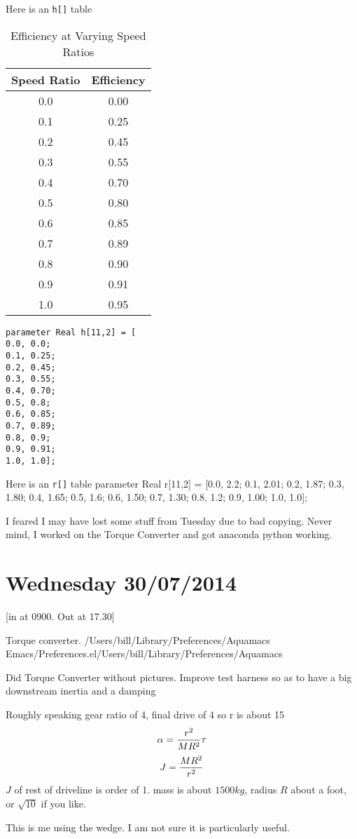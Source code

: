 \documentclass[11pt, oneside]{article}   	%
\begin{document}
Here is an \verb+h[]+ table
\begin{table}[h]
  \centering
  \begin{tabular}{| c | c |}
\hline
Speed Ratio & Efficiency \\
\hline
\hline
0.0 &  0.00 \\ 
0.1 &  0.25 \\ 
0.2 &  0.45 \\ 
0.3 &  0.55 \\ 
0.4 &  0.70 \\ 
0.5 &  0.80 \\ 
0.6 &  0.85 \\ 
0.7 &  0.89 \\ 
0.8 &  0.90 \\ 
0.9 &  0.91 \\ 
1.0 &  0.95 \\
\hline
  \end{tabular}
  \caption{Efficiency at Varying Speed Ratios}
  \label{tab:efficiency}
\end{table}
\begin{verbatim}
parameter Real h[11,2] = [
0.0, 0.0; 
0.1, 0.25; 
0.2, 0.45; 
0.3, 0.55; 
0.4, 0.70; 
0.5, 0.8; 
0.6, 0.85; 
0.7, 0.89; 
0.8, 0.9; 
0.9, 0.91; 
1.0, 1.0];
\end{verbatim}
Here is an \verb+r[]+ table
parameter Real r[11,2] = [0.0, 2.2; 0.1, 2.01; 0.2, 1.87; 0.3, 1.80; 0.4, 1.65; 0.5, 1.6; 0.6, 1.50; 0.7, 1.30; 0.8, 1.2; 0.9, 1.00; 1.0, 1.0];

I feared I may have lost some stuff from Tuesday due to bad copying.
Never mind, I worked on the Torque Converter and got anaconda python
working.

\section{Wednesday 30/07/2014}
[in at 0900.  Out at 17.30]

Torque converter.
/Users/bill/Library/Preferences/Aquamacs
Emacs/Preferences.el/Users/bill/Library/Preferences/Aquamacs

Did Torque Converter without pictures.
Improve test harness so as to have a big downstream inertia and a
damping

Roughly speaking gear ratio of 4, final drive of 4 so r is about 15
$$
\alpha = {r^2\over MR^2} \tau
$$
$$
J = {MR^2 \over r^2}
$$
$J$ of rest of driveline is order of 1.
mass is about $1500kg$, radius $R$ about a foot, or $ \sqrt{10} $ if
you like.

This is me using the wedge.  I am not sure it is particularly useful.
\end{document}
